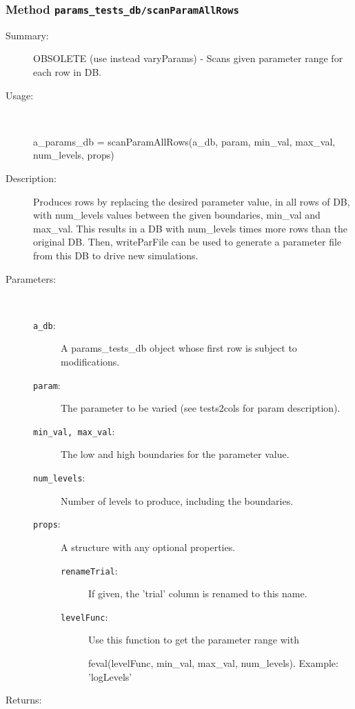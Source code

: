 \subsubsection[Method \texttt{scanParamAllRows}]{Method \texttt{params\_tests\_db/scanParamAllRows}}%
%
\label{ref_params_tests_db__scanParamAllRows}%
\hypertarget{ref_params_tests_db__scanParamAllRows}{}%
\begin{description}
\item[Summary:]OBSOLETE (use instead varyParams) - Scans given parameter range for each row in DB.
%
\item[Usage:]~%
\begin{lyxcode}%
a\_params\_db = scanParamAllRows(a\_db, param, min\_val, max\_val, num\_levels, props)
%
\end{lyxcode}%
%
\item[Description:]%
Produces rows by replacing the desired parameter value, in all rows of DB, 
 with num\_levels values between the given boundaries, min\_val and max\_val. 
 This results in a DB with num\_levels times more rows than the original DB. 
 Then, writeParFile can be used to generate a parameter file from 
 this DB to drive new simulations.
\item[Parameters:]~
\begin{description}%
\item[\texttt{a\_db}:]
 A params\_tests\_db object whose first row is subject to modifications.
\item[\texttt{param}:]
 The parameter to be varied (see tests2cols for param description).
\item[\texttt{min\_val, max\_val}:]
 The low and high boundaries for the parameter value.
\item[\texttt{num\_levels}:]
 Number of levels to produce, including the boundaries.
\item[\texttt{props}:]
 A structure with any optional properties.
\begin{description}%
\item[\texttt{renameTrial}:]
 If given, the 'trial' column is renamed to this name.
\item[\texttt{levelFunc}:]
 Use this function to get the parameter range with 

feval(levelFunc, min\_val, max\_val, num\_levels). Example: 'logLevels'
\end{description}%
\end{description}%
%
\item[Returns:
]~


\end{description}
